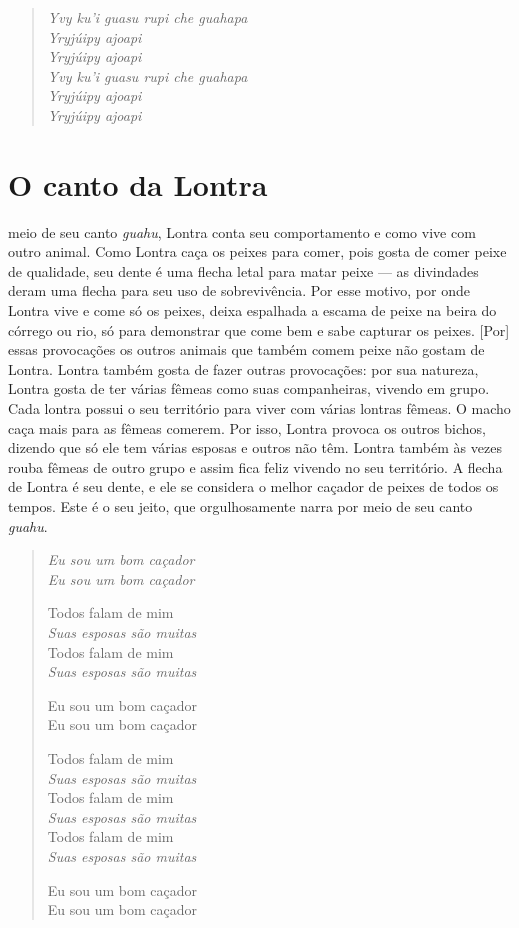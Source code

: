 \begin{verse}
\itshape
Yvy ku'i guasu rupi che guahapa\\
Yryjúipy ajoapi\\
Yryjúipy ajoapi\\

Yvy ku'i guasu rupi che guahapa\\
Yryjúipy ajoapi\\
Yryjúipy ajoapi
\end{verse}

\chapter{O canto da Lontra}

 meio de seu canto \emph{guahu}, Lontra conta seu comportamento e
como vive com outro animal. Como Lontra caça os peixes para comer, pois
gosta de comer peixe de qualidade, seu dente é uma flecha letal para
matar peixe --- as divindades deram uma flecha para seu uso de
sobrevivência. Por esse motivo, por onde Lontra vive e come só os peixes,
deixa espalhada a escama de peixe na beira do córrego ou rio, só para
demonstrar que come bem e sabe capturar os peixes. {[}Por{]} essas
provocações os outros animais que também comem peixe não gostam de
Lontra. Lontra também gosta de fazer outras provocações: por sua
natureza, Lontra gosta de ter várias fêmeas como suas companheiras,
vivendo em grupo. Cada lontra possui o seu território para viver com
várias lontras fêmeas. O macho caça mais para as fêmeas comerem. Por
isso, Lontra provoca os outros bichos, dizendo que só ele tem várias
esposas e outros não têm. Lontra também às vezes rouba fêmeas de outro
grupo e assim fica feliz vivendo no seu território. A flecha de Lontra é
seu dente, e ele se considera o melhor caçador de peixes de todos os
tempos. Este é o seu jeito, que orgulhosamente narra por meio de seu
canto \emph{guahu}.

\begin{verse}
\itshape
Eu sou um bom caçador\\
Eu sou um bom caçador

Todos falam de mim\\
\emph{Suas esposas são muitas}\\
Todos falam de mim\\
\emph{Suas esposas são muitas}

\pagebreak
Eu sou um bom caçador\\
Eu sou um bom caçador

Todos falam de mim\\
\emph{Suas esposas são muitas}\\
Todos falam de mim\\
\emph{Suas esposas são muitas}\\
Todos falam de mim\\
\emph{Suas esposas são muitas}

Eu sou um bom caçador\\
Eu sou um bom caçador
\end{verse}

